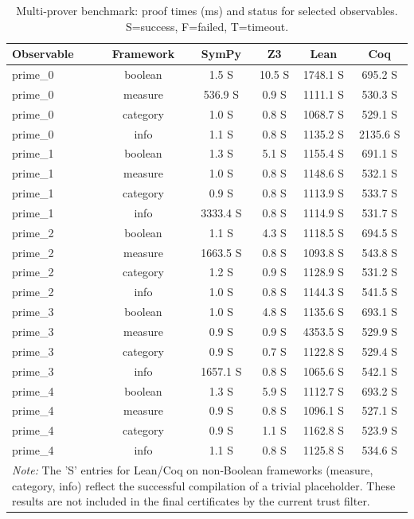 \begin{table}[htbp]
\centering
\caption{Multi‑prover benchmark: proof times (ms) and status for selected observables.
         S=success, F=failed, T=timeout.}
\label{tab:benchmark}
\begin{tabular}{l c c c c c}
\toprule
\textbf{Observable} & \textbf{Framework} & \textbf{SymPy} & \textbf{Z3} & \textbf{Lean} & \textbf{Coq} \\
\midrule
prime\_0 & boolean & 1.5 S & 10.5 S & 1748.1 S & 695.2 S \\
prime\_0 & measure & 536.9 S & 0.9 S & 1111.1 S & 530.3 S \\
prime\_0 & category & 1.0 S & 0.8 S & 1068.7 S & 529.1 S \\
prime\_0 & info & 1.1 S & 0.8 S & 1135.2 S & 2135.6 S \\
prime\_1 & boolean & 1.3 S & 5.1 S & 1155.4 S & 691.1 S \\
prime\_1 & measure & 1.0 S & 0.8 S & 1148.6 S & 532.1 S \\
prime\_1 & category & 0.9 S & 0.8 S & 1113.9 S & 533.7 S \\
prime\_1 & info & 3333.4 S & 0.8 S & 1114.9 S & 531.7 S \\
prime\_2 & boolean & 1.1 S & 4.3 S & 1118.5 S & 694.5 S \\
prime\_2 & measure & 1663.5 S & 0.8 S & 1093.8 S & 543.8 S \\
prime\_2 & category & 1.2 S & 0.9 S & 1128.9 S & 531.2 S \\
prime\_2 & info & 1.0 S & 0.8 S & 1144.3 S & 541.5 S \\
prime\_3 & boolean & 1.0 S & 4.8 S & 1135.6 S & 693.1 S \\
prime\_3 & measure & 0.9 S & 0.9 S & 4353.5 S & 529.9 S \\
prime\_3 & category & 0.9 S & 0.7 S & 1122.8 S & 529.4 S \\
prime\_3 & info & 1657.1 S & 0.8 S & 1065.6 S & 542.1 S \\
prime\_4 & boolean & 1.3 S & 5.9 S & 1112.7 S & 693.2 S \\
prime\_4 & measure & 0.9 S & 0.8 S & 1096.1 S & 527.1 S \\
prime\_4 & category & 0.9 S & 1.1 S & 1162.8 S & 523.9 S \\
prime\_4 & info & 1.1 S & 0.8 S & 1125.8 S & 534.6 S \\
\bottomrule
\multicolumn{6}{p{0.9\textwidth}}{\small\emph{Note:} The 'S' entries for Lean/Coq on non‑Boolean frameworks (measure, category, info) reflect the successful compilation of a trivial placeholder. These results are not included in the final certificates by the current trust filter.}
\end{tabular}
\end{table}